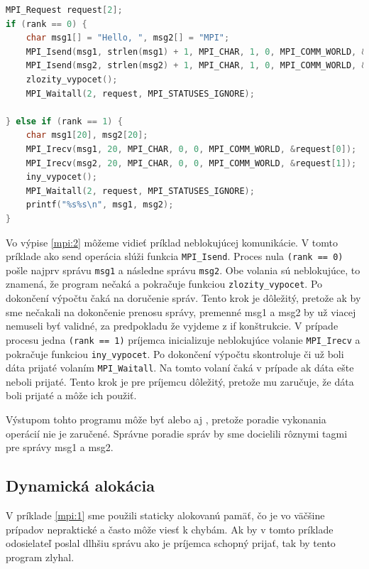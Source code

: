 \begin{lstlisting}[language=c, caption={Neblokujúca komunikácia}, label={mpi:2}]
MPI_Request request[2];
if (rank == 0) {
    char msg1[] = "Hello, ", msg2[] = "MPI";
    MPI_Isend(msg1, strlen(msg1) + 1, MPI_CHAR, 1, 0, MPI_COMM_WORLD, &request[0]);
    MPI_Isend(msg2, strlen(msg2) + 1, MPI_CHAR, 1, 0, MPI_COMM_WORLD, &request[1]);
    zlozity_vypocet();
    MPI_Waitall(2, request, MPI_STATUSES_IGNORE);

} else if (rank == 1) {
    char msg1[20], msg2[20];
    MPI_Irecv(msg1, 20, MPI_CHAR, 0, 0, MPI_COMM_WORLD, &request[0]);
    MPI_Irecv(msg2, 20, MPI_CHAR, 0, 0, MPI_COMM_WORLD, &request[1]);
    iny_vypocet();
    MPI_Waitall(2, request, MPI_STATUSES_IGNORE);
    printf("%s%s\n", msg1, msg2);
}
\end{lstlisting}

Vo výpise \ref{mpi:2} môžeme vidieť príklad neblokujúcej komunikácie. V tomto príklade ako send operácia slúži funkcia \texttt{MPI\_Isend}.
Proces nula \texttt{(rank == 0)} pošle najprv správu \texttt{msg1} a následne správu \texttt{msg2}.
Obe volania sú neblokujúce, to znamená, že program nečaká
a pokračuje funkciou \texttt{zlozity\_vypocet}. Po dokončení výpočtu čaká na doručenie správ.
Tento krok je dôležitý, pretože ak by sme nečakali na dokončenie prenosu správy, premenné msg1 a msg2 by už viacej nemuseli byť validné,
za predpokladu že vyjdeme z if konštrukcie.
V prípade procesu jedna \texttt{(rank == 1)} príjemca inicializuje neblokujúce volanie \texttt{MPI\_Irecv} a pokračuje funkciou \texttt{iny\_vypocet}.
Po dokončení výpočtu skontroluje či už boli dáta prijaté volaním \texttt{MPI\_Waitall}.
Na tomto volaní čaká v prípade ak dáta ešte neboli prijaté.
Tento krok je pre príjemcu dôležitý, pretože mu zaručuje, že dáta boli prijaté a môže ich použiť.

Výstupom tohto programu môže byť  alebo aj , pretože poradie vykonania operácií nie je zaručené.
Správne poradie správ by sme docielili rôznymi tagmi pre správy msg1 a msg2.
\subsection{Dynamická alokácia}
V príklade \ref{mpi:1} sme použili staticky alokovanú pamäť, čo je vo väčšine prípadov nepraktické a často môže viesť k chybám.
Ak by v tomto príklade odosielateľ poslal dlhšiu správu ako je príjemca schopný prijať, tak by tento program zlyhal.

